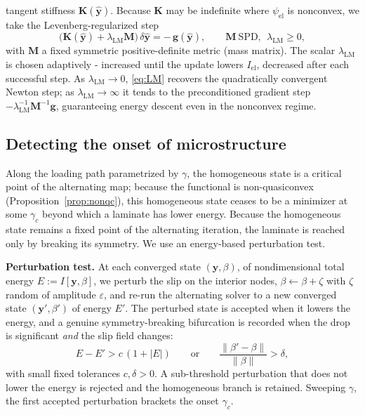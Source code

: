 \documentclass[12pt]{article}
\theoremstyle{plain}
\theoremstyle{definition}
\newcommand{\by}{\bm{y}}
\newcommand{\bK}{\bm{K}}
\newcommand{\bM}{\bm{M}}
\begin{document}
tangent stiffness $\bK(\hat{\by})$. Because $\bK$ may be indefinite where
$\psi_{\mathrm{el}}$ is nonconvex, we take the Levenberg-regularized step
\begin{equation}\label{eq:LM}
  \bigl(\bK(\hat{\by})+\lambda_{\mathrm{LM}}\bM\bigr)\,\delta\hat{\by}
  =-\,\bm{g}(\hat{\by}),\qquad \bM\ \text{SPD},\ \ \lambda_{\mathrm{LM}}\ge0,
\end{equation}
with $\bM$ a fixed symmetric positive-definite metric (mass matrix). The scalar
$\lambda_{\mathrm{LM}}$ is chosen adaptively - increased until the update
lowers $I_{\mathrm{el}}$, decreased after each successful step. As
$\lambda_{\mathrm{LM}}\!\to\!0$, \eqref{eq:LM} recovers the quadratically
convergent Newton step; as $\lambda_{\mathrm{LM}}\!\to\!\infty$ it tends to the
preconditioned gradient step $-\lambda_{\mathrm{LM}}^{-1}\bM^{-1}\bm{g}$,
guaranteeing energy descent even in the nonconvex regime.

\subsection{Detecting the onset of microstructure}\label{sec:bifurcation}
Along the loading path parametrized by $\gamma$, the homogeneous state is a
critical point of the alternating map; because the functional is
non-quasiconvex (Proposition~\ref{prop:nonqc}), this homogeneous state ceases to
be a minimizer at some $\gamma_c$ beyond which a laminate has lower energy. Because the homogeneous state remains a fixed point of the alternating iteration, the laminate is reached only by breaking its symmetry. We use an energy-based perturbation test.

\smallskip
\noindent\textbf{Perturbation test.}
At each converged state $(\by,\beta)$, of nondimensional total energy
$E:=I[\by,\beta]$, we perturb the slip on the interior nodes,
$\beta\leftarrow\beta+\zeta$ with $\zeta$ random of amplitude $\varepsilon$, and
re-run the alternating solver to a new converged state $(\by',\beta')$ of energy
$E'$. The perturbed state is accepted when it lowers the energy, and a genuine
symmetry-breaking bifurcation is recorded when the drop is significant \emph{and}
the slip field changes:
\begin{equation}\label{eq:bif-test}
  E-E'>c\,(1+|E|)\qquad\text{or}\qquad
  \frac{\|\beta'-\beta\|}{\|\beta\|}>\delta ,
\end{equation}
with small fixed tolerances $c,\delta>0$. A sub-threshold perturbation that does
not lower the energy is rejected and the
homogeneous branch is retained. Sweeping $\gamma$, the first accepted perturbation brackets the onset $\gamma_c$.
\end{document}
